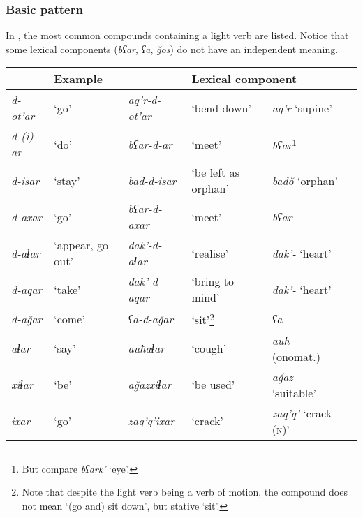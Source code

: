 \subsubsection{Basic pattern} \label{lightverbsp}

In , the most common compounds containing a light verb are listed. Notice that some lexical components (\textit{bʕar}, \textit{ʕa}, \textit{\u{g}os}) do not have an independent meaning.

\begin{table}
	\small
	\begin{tabular}{l@{~}l l@{~}l l@{~}l}
		\lsptoprule
		\multicolumn{2}{l}{{Light verb}} & \multicolumn{2}{l}{{Example}} & \multicolumn{2}{l}{Lexical component} \\
        \midrule
        
		\textit{d-ot'ar} & `go' & \textit{aq'r-d-ot'ar} & `bend down' & \textit{aq'r} `supine' \\
		
		\textit{d-(i)-ar} & `do' & \textit{bʕar-d-ar} & `meet' & \textit{bʕar}\footnote{But compare \textit{bʕark'} `eye'.} \\
		
		\textit{d-isar} & `stay' & \textit{bad-d-isar} & `be left as orphan' & \textit{bad\u{o}} `orphan' \\
		
		\textit{d-axar} & `go' & \textit{bʕar-d-axar} & `meet' & \textit{bʕar} \\
		
		\textit{d-aɬar} & `appear, go out' & \textit{dak'-d-aɬar} & `realise' & \textit{dak'-} `heart' \\
		\textit{d-aqar} & `take' & \textit{dak'-d-aqar} & `bring to mind' & \textit{dak'-} `heart' \\
		
		\textit{d-a\u{g}ar} & `come' & \textit{ʕa-d-a\u{g}ar} & `sit'\footnote{Note that despite the light verb being a verb of motion, the compound does not mean `(go and) sit down', but stative `sit'.} & \textit{ʕa} \\
		
		\textit{aɬar} & `say' & \textit{auħaɬar}  & `cough' & \textit{auħ} (onomat.) \\
		
		\textit{xiɬar} & `be' & \textit{a\u{g}azxiɬar} &	`be used' & \textit{a\u{g}az} `suitable' \\
		
		\textit{ixar} & `go' & \textit{zaq'q'ixar} & `crack' & \textit{zaq'q'} `crack (\textsc{n})' \\
		

\end{tabular}
\end{table}
